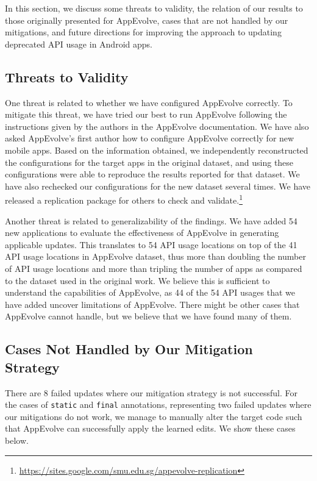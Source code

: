 In this section, we discuss some threats to validity, the relation of our
results to those originally presented for AppEvolve, cases that are not
handled by our mitigations, and future directions for improving the
approach to updating deprecated API usage in Android apps.

\subsection{Threats to Validity}

One threat is related to whether we have configured AppEvolve correctly. To
mitigate this threat, we have tried our best to run AppEvolve following the
instructions given by the authors in the AppEvolve documentation. We have
also asked AppEvolve's first author how to configure AppEvolve correctly
for new mobile apps. Based on the information obtained, we independently
reconstructed the configurations for the target apps in the original
dataset, and using these configurations were able to reproduce the results
reported for that dataset.  We have also rechecked our configurations for
the new dataset several times. We have released a replication package for
others to check and
validate.\footnote{\url{https://sites.google.com/smu.edu.sg/appevolve-replication}}

Another threat is related to generalizability of the findings. We have added 54 new applications to evaluate the effectiveness of
AppEvolve in generating applicable updates. This translates to 54 API usage
locations on top of the 41 API usage locations in AppEvolve dataset, thus
more than doubling the number of API usage locations and more than tripling the number of apps as compared to the dataset used in the original work. We
believe this is sufficient to understand the capabilities of AppEvolve, as
44 of the 54 API usages that we have added uncover limitations of
AppEvolve. There might be other cases that AppEvolve cannot handle, but we
believe that we have found many of them.

\subsection{Cases Not Handled by Our Mitigation Strategy}

There are 8 failed updates  where our mitigation
strategy is not successful. For the cases of {\tt static} and {\tt final}
annotations, representing two failed updates where our mitigations do not
work, we manage to manually alter the target code such that AppEvolve can
successfully apply the learned edits. We show these cases below.

